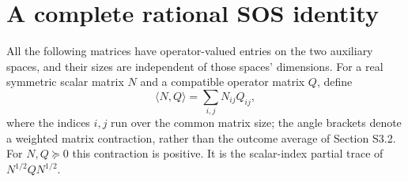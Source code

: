 \documentclass[11pt]{article}
\begin{document}
\section{A complete rational SOS identity}
\label{sec:sos}
All the following matrices have operator-valued entries on the two auxiliary spaces, and their sizes are independent of those spaces' dimensions. For a real symmetric scalar matrix $N$ and a compatible operator matrix $Q$, define
\begin{equation}
 \langle N,Q\rangle=\sum_{i,j}N_{ij}Q_{ij},
 \label{eq:weighted-contraction}
\end{equation}
where the indices $i,j$ run over the common matrix size; the angle brackets denote a weighted matrix contraction, rather than the outcome average of Section S3.2. For $N,Q\succeq0$ this contraction is positive. It is the scalar-index partial trace of $N^{1/2}QN^{1/2}$.
\end{document}
